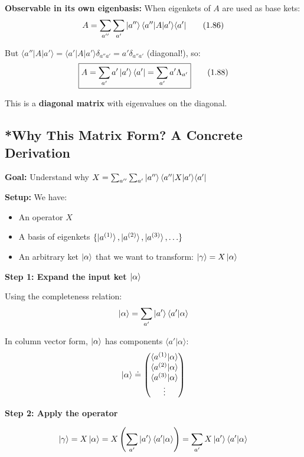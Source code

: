 \documentclass[11pt,a4paper]{article}
\begin{document}
\textbf{Observable in its own eigenbasis:}
When eigenkets of $A$ are used as base kets:
\begin{equation}
A = \sum_{a''}\sum_{a'}\ket{a''}\langle a''|A|a'\rangle\langle a'|
\tag{1.86}
\end{equation}

But $\langle a''|A|a'\rangle = \langle a'|A|a'\rangle\delta_{a''a'} = a'\delta_{a''a'}$ (diagonal!), so:
\begin{equation}
\boxed{A = \sum_{a'}a'\ket{a'}\langle a'| = \sum_{a'}a'\Lambda_{a'}}
\tag{1.88}
\end{equation}

This is a \textbf{diagonal matrix} with eigenvalues on the diagonal.

\subsection*{*Why This Matrix Form? A Concrete Derivation}

\textbf{Goal:} Understand why $X = \sum_{a''}\sum_{a'}\ket{a''}\langle a''|X|a'\rangle\langle a'|$

\textbf{Setup:} We have:
\begin{itemize}
\item An operator $X$
\item A basis of eigenkets $\{\ket{a^{(1)}}, \ket{a^{(2)}}, \ket{a^{(3)}}, \ldots\}$
\item An arbitrary ket $\ket{\alpha}$ that we want to transform: $\ket{\gamma} = X\ket{\alpha}$
\end{itemize}

\textbf{Step 1: Expand the input ket $\ket{\alpha}$}

Using the completeness relation:
$$\ket{\alpha} = \sum_{a'}\ket{a'}\langle a'|\alpha\rangle$$

In column vector form, $\ket{\alpha}$ has components $\langle a'|\alpha\rangle$:
$$\ket{\alpha} \doteq \begin{pmatrix}
\langle a^{(1)}|\alpha\rangle \\
\langle a^{(2)}|\alpha\rangle \\
\langle a^{(3)}|\alpha\rangle \\
\vdots
\end{pmatrix}$$

\textbf{Step 2: Apply the operator}

$$\ket{\gamma} = X\ket{\alpha} = X\left(\sum_{a'}\ket{a'}\langle a'|\alpha\rangle\right) = \sum_{a'}X\ket{a'}\langle a'|\alpha\rangle$$
\end{document}
